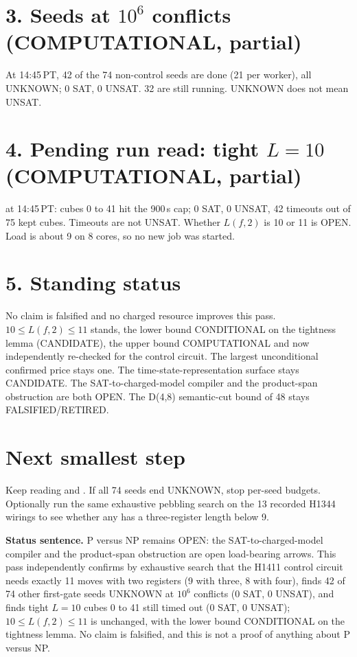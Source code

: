 \documentclass[11pt]{article}
\begin{document}
\section*{3. Seeds at $10^6$ conflicts (COMPUTATIONAL, partial)}
At 14:45\,PT, 42 of the 74 non-control seeds are done (21 per worker), all UNKNOWN; 0 SAT, 0 UNSAT. 32 are still running. UNKNOWN does not mean UNSAT.

\section*{4. Pending run read: tight $L=10$ (COMPUTATIONAL, partial)}
 at 14:45\,PT: cubes 0 to 41 hit the 900\,s cap; 0 SAT, 0 UNSAT, 42 timeouts out of 75 kept cubes. Timeouts are not UNSAT. Whether $L(f,2)$ is 10 or 11 is OPEN. Load is about 9 on 8 cores, so no new job was started.

\section*{5. Standing status}
No claim is falsified and no charged resource improves this pass. $10\le L(f,2)\le 11$ stands, the lower bound CONDITIONAL on the tightness lemma (CANDIDATE), the upper bound COMPUTATIONAL and now independently re-checked for the control circuit. The largest unconditional confirmed price stays one. The time-state-representation surface stays CANDIDATE. The SAT-to-charged-model compiler and the product-span obstruction are both OPEN. The D(4,8) semantic-cut bound of 48 stays FALSIFIED/RETIRED.

\section*{Next smallest step}
Keep reading  and . If all 74 seeds end UNKNOWN, stop per-seed budgets. Optionally run the same exhaustive pebbling search on the 13 recorded H1344 wirings to see whether any has a three-register length below 9.

\bigskip
\noindent\textbf{Status sentence.} P versus NP remains OPEN: the SAT-to-charged-model compiler and the product-span obstruction are open load-bearing arrows. This pass independently confirms by exhaustive search that the H1411 control circuit needs exactly 11 moves with two registers (9 with three, 8 with four), finds 42 of 74 other first-gate seeds UNKNOWN at $10^6$ conflicts (0 SAT, 0 UNSAT), and finds tight $L=10$ cubes 0 to 41 still timed out (0 SAT, 0 UNSAT); $10\le L(f,2)\le 11$ is unchanged, with the lower bound CONDITIONAL on the tightness lemma. No claim is falsified, and this is not a proof of anything about P versus NP.
\end{document}

